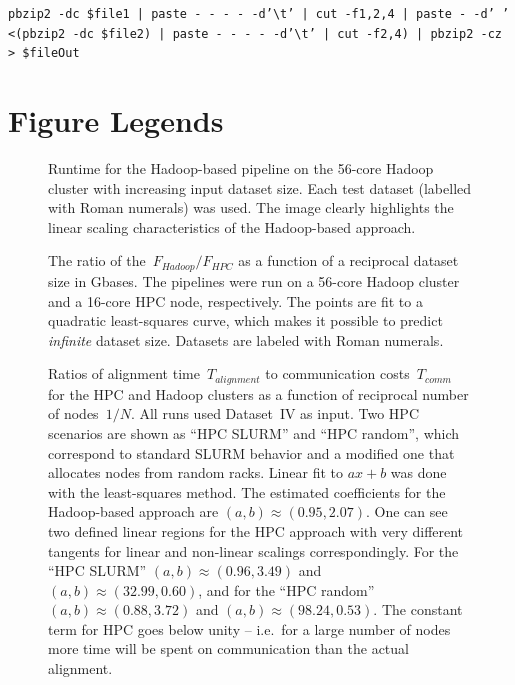 \documentclass[10pt]{article}
\begin{document}
\texttt {pbzip2 -dc  \${file1} | paste - - - - -d'\textbackslash t' | cut -f1,2,4 | paste - -d' ' <(pbzip2 -dc \${file2}) 
| paste - - - - -d'\textbackslash t' | cut -f2,4) | pbzip2 -cz > \${fileOut}}

\section*{Figure Legends}

\begin{figure}[!ht]
	
	\caption{%
		Runtime for the Hadoop-based pipeline on the 56-core Hadoop cluster with
		increasing input dataset size. Each test dataset (labelled with Roman
		numerals) was used. The image clearly highlights the linear scaling
		characteristics of the Hadoop-based approach.
		}
	\label{fig:fig1}
\end{figure}


\begin{figure}[!ht]
	
	\caption{%
	The ratio of the~$F_{Hadoop}/F_{HPC}$ as a function of a reciprocal
	dataset size in Gbases. The pipelines were run on a 56-core Hadoop cluster and
	a 16-core HPC node, respectively.
	The points are fit to a quadratic least-squares curve, which makes it possible
	to predict {\it infinite} dataset size. Datasets are labeled with Roman
	numerals.
	}
	\label{fig:fig2}
\end{figure}


\begin{figure}[!ht]
	\small
	
	\normalsize
\caption{%
	Ratios of alignment time~$T_{alignment}$ to communication costs~$T_{comm}$ for
	the HPC and Hadoop clusters as a function of reciprocal number of nodes~$1/N$.
	All runs used Dataset~IV as input. Two HPC scenarios are shown as ``HPC
	SLURM'' and ``HPC random'', which correspond to standard SLURM behavior and a
	modified one that allocates nodes from random racks.  Linear fit to $ax+b$ was
	done with the least-squares method.  The estimated coefficients for the
	Hadoop-based approach are $(a,b)\approx(0.95,2.07)$.  One can see two defined
	linear regions for the HPC approach with very different tangents for linear
	and non-linear scalings correspondingly.  For  the ``HPC SLURM'' $(a,b)\approx
	(0.96, 3.49)$ and $(a,b)\approx (32.99, 0.60)$, and for  the ``HPC random''
	$(a,b)\approx (0.88, 3.72)$ and $(a,b)\approx (98.24, 0.53)$.  The constant
	term for HPC goes below unity -- i.e.\ for a large number of nodes more time
	will be spent on communication than the actual alignment. 
	}

	\label{fig:fig3}
\end{figure}
\end{document}
